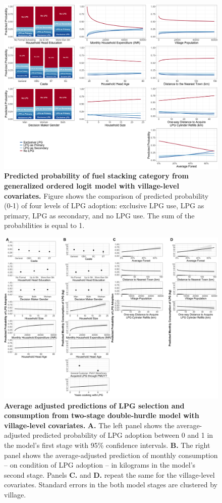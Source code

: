 \documentclass[11pt]{article}
\begin{document}
\begin{figure}[h!]
	\centering
	\includegraphics[scale=0.38]{Figures/Marginal_Effects/gologit_village.png}
\caption{\textbf{Predicted probability of fuel stacking category from generalized ordered logit model with village-level covariates.} Figure shows the comparison of predicted probability (0-1) of four levels of LPG adoption: exclusive LPG use, LPG as primary, LPG as secondary, and no LPG use. The sum of the probabilities is equal to 1.}
	\label{gologit_village}
\end{figure}


\begin{figure}[h!]
	\includegraphics[scale=0.30]{Figures/Marginal_Effects/churdle_ME_village.png}
	\caption{\textbf{Average adjusted predictions of LPG selection and consumption from two-stage double-hurdle model with village-level covariates.}  \textbf{A.} The left panel shows the average-adjusted predicted probability of LPG adoption between 0 and 1 in the model's first stage with 95\% confidence intervals. \textbf{B.} The right panel shows the average-adjusted prediction of monthly consumption -- on condition of LPG adoption -- in kilograms in the model's second stage. Panels \textbf{C.} and \textbf{D.} repeat the same for the village-level covariates. Standard errors in the both model stages are clustered by village.} 
	\label{churdle_ME_village}
\end{figure}
\end{document}
